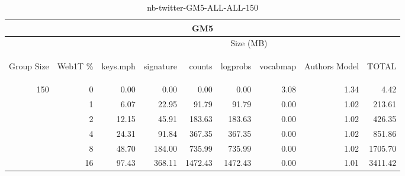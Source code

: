 \begin{center}
\begin{table}[htbp] 
 \begin{center}
\begin{tabular}{ | r | r | r | r | r | r | r | r | r |}
\hline
\multicolumn{9}{|c|}{GM5}\\
\hline
 & & \multicolumn{7}{|c|}{Size (MB)}\\ \cline{3-9}
\begin{sideways}Group Size\end{sideways} & \begin{sideways}Web1T \% \end{sideways} & \begin{sideways}keys.mph\end{sideways} & \begin{sideways}signature\end{sideways} & \begin{sideways}counts\end{sideways} & \begin{sideways}logprobs\end{sideways} & \begin{sideways}vocabmap\end{sideways} & \begin{sideways}Authors Model \end{sideways} & \begin{sideways}TOTAL\end{sideways}\\
\hline
\multirow{5}{*}{150}
 & 0 & 0.00 & 0.00 & 0.00 & 0.00 & 3.08 & 1.34 & 4.42\\ \cline{2-9}
 & 1 & 6.07 & 22.95 & 91.79 & 91.79 & 0.00 & 1.02 & 213.61\\ \cline{2-9}
 & 2 & 12.15 & 45.91 & 183.63 & 183.63 & 0.00 & 1.02 & 426.35\\ \cline{2-9}
 & 4 & 24.31 & 91.84 & 367.35 & 367.35 & 0.00 & 1.02 & 851.86\\ \cline{2-9}
 & 8 & 48.70 & 184.00 & 735.99 & 735.99 & 0.00 & 1.02 & 1705.70\\ \cline{2-9}
 & 16 & 97.43 & 368.11 & 1472.43 & 1472.43 & 0.00 & 1.01 & 3411.42\\ \cline{2-9}
\hline
\end{tabular}
\caption{nb-twitter-GM5-ALL-ALL-150}
\label{table:nb-twitter-GM5-ALL-ALL-150}
\end{center}
 \end{table}
\end{center}


